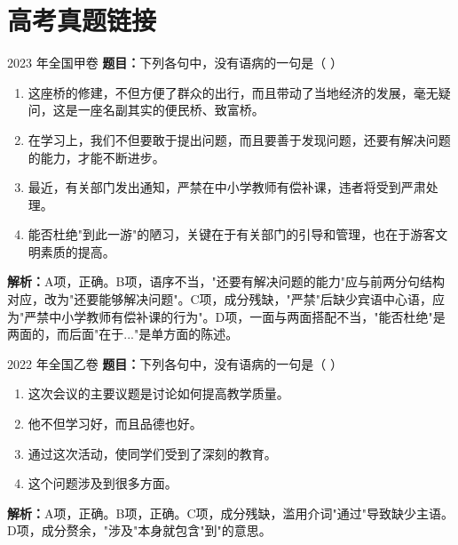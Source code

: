 \documentclass[a4paper,12pt]{ctexrep}
\newcommand{\analysisicon}{\textcolor{accent}{\faSearch}}
\begin{document}
\section{高考真题链接}

\begin{examplebox}{2023 年全国甲卷}
\textbf{题目：}下列各句中，没有语病的一句是（ ）
\begin{enumerate}[label=\Alph*.]
    \item 这座桥的修建，不但方便了群众的出行，而且带动了当地经济的发展，毫无疑问，这是一座名副其实的便民桥、致富桥。
    \item 在学习上，我们不但要敢于提出问题，而且要善于发现问题，还要有解决问题的能力，才能不断进步。
    \item 最近，有关部门发出通知，严禁在中小学教师有偿补课，违者将受到严肃处理。
    \item 能否杜绝"到此一游"的陋习，关键在于有关部门的引导和管理，也在于游客文明素质的提高。
\end{enumerate}

\analysisicon \textbf{解析：}A项，正确。B项，语序不当，"还要有解决问题的能力"应与前两分句结构对应，改为"还要能够解决问题"。C项，成分残缺，"严禁"后缺少宾语中心语，应为"严禁中小学教师有偿补课的行为"。D项，一面与两面搭配不当，"能否杜绝"是两面的，而后面"在于..."是单方面的陈述。
\end{examplebox}

\begin{examplebox}{2022 年全国乙卷}
\textbf{题目：}下列各句中，没有语病的一句是（ ）
\begin{enumerate}[label=\Alph*.]
    \item 这次会议的主要议题是讨论如何提高教学质量。
    \item 他不但学习好，而且品德也好。
    \item 通过这次活动，使同学们受到了深刻的教育。
    \item 这个问题涉及到很多方面。
\end{enumerate}

\analysisicon \textbf{解析：}A项，正确。B项，正确。C项，成分残缺，滥用介词"通过"导致缺少主语。D项，成分赘余，"涉及"本身就包含"到"的意思。
\end{examplebox}
\end{document}
